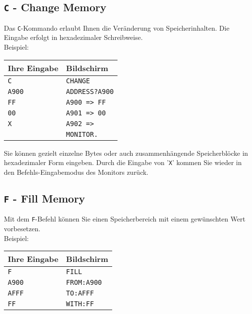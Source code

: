 \documentclass[10pt,a4paper,twoside,final,openright,titlepage]{memoir}
\begin{document}
\subsection{\texttt{C} - Change Memory}

Das \texttt{C}-Kommando erlaubt Ihnen die Veränderung von
Speicherinhalten. Die Eingabe erfolgt in
hexadezimaler Schreibweise.\\

Beispiel: \\

\renewcommand{\arraystretch}{1.2}
\begin{tabular}{p{10em}p{10em}}
Ihre Eingabe	& Bildschirm \\ \hline
\texttt{C}		& \texttt{CHANGE} \\
\texttt{A900}	& \texttt{ADDRESS?A900} \\
\texttt{FF}		& \texttt{A900 => FF} \\
\texttt{00}		& \texttt{A901 => 00} \\
\texttt{X}		& \texttt{A902 =>} \\
				& \texttt{MONITOR.}
\end{tabular}
\renewcommand{\arraystretch}{1.8}
\bigskip

Sie können gezielt einzelne Bytes oder auch zusammenhängende Speicherblöcke in hexadezimaler Form
eingeben. Durch die Eingabe von '\texttt{X}' kommen Sie wieder in
den Befehls-Eingabemodus des Monitors zurück.

\subsection{\texttt{F} - Fill Memory}

Mit dem \texttt{F}-Befehl können Sie einen Speicherbereich mit
einem gewünschten Wert vorbesetzen.\\

Beispiel: \\

\renewcommand{\arraystretch}{1.2}
\begin{tabular}{p{10em}p{10em}}
Ihre Eingabe	& Bildschirm \\ \hline
\texttt{F}		& \texttt{FILL} \\
\texttt{A900}	& \texttt{FROM:A900} \\
\texttt{AFFF}	& \texttt{TO:AFFF} \\
\texttt{FF}		& \texttt{WITH:FF} \\
\end{tabular}
\renewcommand{\arraystretch}{1.8}
\bigskip
\end{document}
